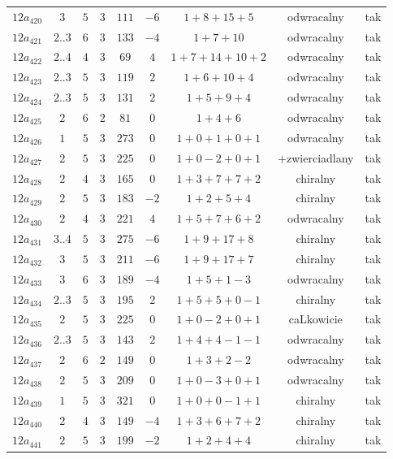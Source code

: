 \begin{longtable}{ccccccccc}
$12a_{420}$ & $3$ & $5$ & $3$ & $111$ & $-6$ & $1+8+15+5$ & odwracalny & tak \\
$12a_{421}$ & $2..3$ & $6$ & $3$ & $133$ & $-4$ & $1+7+10$ & odwracalny & tak \\
$12a_{422}$ & $2..4$ & $4$ & $3$ & $69$ & $4$ & $1+7+14+10+2$ & odwracalny & tak \\
$12a_{423}$ & $2..3$ & $5$ & $3$ & $119$ & $2$ & $1+6+10+4$ & odwracalny & tak \\
$12a_{424}$ & $2..3$ & $5$ & $3$ & $131$ & $2$ & $1+5+9+4$ & odwracalny & tak \\
$12a_{425}$ & $2$ & $6$ & $2$ & $81$ & $0$ & $1+4+6$ & odwracalny & tak \\
$12a_{426}$ & $1$ & $5$ & $3$ & $273$ & $0$ & $1+0+1+0+1$ & odwracalny & tak \\
$12a_{427}$ & $2$ & $5$ & $3$ & $225$ & $0$ & $1+0-2+0+1$ & +zwierciadlany & tak \\
$12a_{428}$ & $2$ & $4$ & $3$ & $165$ & $0$ & $1+3+7+7+2$ & chiralny & tak \\
$12a_{429}$ & $2$ & $5$ & $3$ & $183$ & $-2$ & $1+2+5+4$ & chiralny & tak \\
$12a_{430}$ & $2$ & $4$ & $3$ & $221$ & $4$ & $1+5+7+6+2$ & odwracalny & tak \\
$12a_{431}$ & $3..4$ & $5$ & $3$ & $275$ & $-6$ & $1+9+17+8$ & chiralny & tak \\
$12a_{432}$ & $3$ & $5$ & $3$ & $211$ & $-6$ & $1+9+17+7$ & chiralny & tak \\
$12a_{433}$ & $3$ & $6$ & $3$ & $189$ & $-4$ & $1+5+1-3$ & odwracalny & tak \\
$12a_{434}$ & $2..3$ & $5$ & $3$ & $195$ & $2$ & $1+5+5+0-1$ & chiralny & tak \\
$12a_{435}$ & $2$ & $5$ & $3$ & $225$ & $0$ & $1+0-2+0+1$ & caLkowicie & tak \\
$12a_{436}$ & $2..3$ & $5$ & $3$ & $143$ & $2$ & $1+4+4-1-1$ & odwracalny & tak \\
$12a_{437}$ & $2$ & $6$ & $2$ & $149$ & $0$ & $1+3+2-2$ & odwracalny & tak \\
$12a_{438}$ & $2$ & $5$ & $3$ & $209$ & $0$ & $1+0-3+0+1$ & odwracalny & tak \\
$12a_{439}$ & $1$ & $5$ & $3$ & $321$ & $0$ & $1+0+0-1+1$ & chiralny & tak \\
$12a_{440}$ & $2$ & $4$ & $3$ & $149$ & $-4$ & $1+3+6+7+2$ & chiralny & tak \\
$12a_{441}$ & $2$ & $5$ & $3$ & $199$ & $-2$ & $1+2+4+4$ & chiralny & tak \\

\end{longtable}
